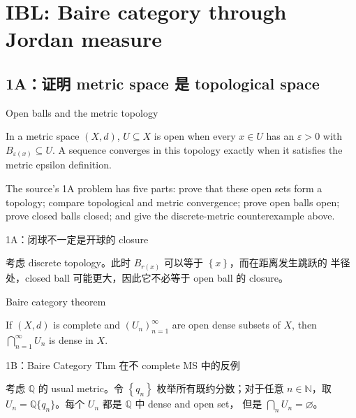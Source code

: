 \chapter{IBL: Baire category through Jordan measure}

\section{1A：证明 metric space 是 topological space}

\begin{definition}{Open balls and the metric topology}

In a metric space \(\left( {X,d} \right)\), \(U \subseteq X\) is open when every \(x \in U\) has an \(\varepsilon > 0\) with \(B_{\varepsilon{(x)}} \subseteq U\). A sequence converges in this topology exactly when it satisfies the metric epsilon definition.

\end{definition}

The source's 1A problem has five parts: prove that these open sets form a topology; compare topological and metric convergence; prove open balls open; prove closed balls closed; and give the discrete-metric counterexample above.

\begin{qlsolution}{1A：闭球不一定是开球的 closure}

考虑 discrete topology。此时 \(B_{r{(x)}}\) 可以等于 \(\left\{ x \right\}\)，而在距离发生跳跃的 半径处，closed ball 可能更大，因此它不必等于 open ball 的 closure。

\end{qlsolution}

\begin{theorem}{Baire category theorem}

If \(\left( {X,d} \right)\) is complete and \(\left( U_{n} \right)_{n = 1}^{\infty}\) are open dense subsets of \(X\), then \(\bigcap_{n = 1}^{\infty}U_{n}\) is dense in \(X\).

\end{theorem}

\begin{qlsolution}{1B：Baire Category Thm 在不 complete MS 中的反例}

考虑 \(\mathbb{Q}\) 的 usual metric。令 \(\left\{ q_{n} \right\}\) 枚举所有既约分数；对于任意 \(n \in \mathbb{N}\)，取 \(U_{n} = \mathbb{Q}\{ q_{n}\}\)。每个 \(U_{n}\) 都是 \(\mathbb{Q}\) 中 dense and open set， 但是 \(\bigcap_{n}U_{n} = \varnothing\)。

\end{qlsolution}

